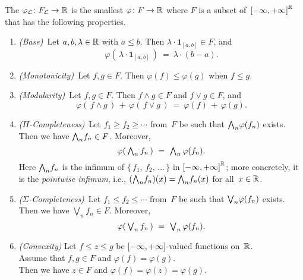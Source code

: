 \documentclass[main.tex]{subfiles}
\begin{document}
\begin{dfn}
\label{D:lebesgue-integral}
The 
$\varphi_{\mathcal{L}} \colon F_{\mathcal{L}} \rightarrow \mathbb{R}$
is the smallest  $\varphi\colon F \rightarrow \mathbb{R}$
where $F$ is a subset of~${[-\infty,+\infty]}^{\mathbb{R}}$
that has the following properties.
\begin{enumerate}
\item
\label{prop:integral-1}
\textit{(Base)}\ 
Let $a,b,\lambda\in\mathbb{R}$ with $a\leq b$. 
Then $\lambda\cdot\mathbf{1}_{[a,b]}\in F$,
and
\begin{equation*}
\varphi(\,\lambda\cdot \mathbf{1}_{[a,b]}\,)\ =\ \lambda\cdot(b-a).
\end{equation*}

\item
\label{prop:integral-2}
\textit{(Monotonicity)}\ 
Let $f,g\in F$.
Then $\varphi(f)\leq \varphi(g)$
when  $f\leq g$.

\item
\label{prop:integral-3}
\textit{(Modularity)}\ 
Let $f,g\in F$.
Then $f\wedge g\in F$ and $f \vee g \in F$, and
\begin{equation*}
\varphi(\,f\wedge g\,)\,+\,\varphi(\,f\vee g\,)\ =\ \varphi(f)\,+\,\varphi(g).
\end{equation*}

\item
\label{prop:integral-4}
\textit{($\Pi$-Completeness)}\ 
Let $f_1 \geq f_2 \geq \dotsb$
from~$F$ be such that $\textstyle{\bigwedge}_n \varphi(f_n)$ exists.\\
Then we have $\textstyle{\bigwedge}_n f_n \in F$.
Moreover,
\begin{equation*}
\varphi(\, \textstyle{ \bigwedge_n f_n }\,) \ =\ \textstyle{\bigwedge}_n \,\varphi(f_n).
\end{equation*}
Here $\textstyle{\bigwedge}_n f_n$
is the infimum of $\{\,f_1,\,f_2,\,\dotsc\,\}$ in ${[-\infty,+\infty]}^{\mathbb{R}}$;
more concretely,
it is the \emph{pointwise infimum}, i.e., $(\textstyle{\bigwedge}_n f_n)(x) = \textstyle{\bigwedge}_n f_n(x)$
for all~$x\in \mathbb{R}$.

\item
\label{prop:integral-5}
\textit{($\Sigma$-Completeness)}\ 
Let $f_1 \leq f_2 \leq \dotsb$
from~$F$ 
be such that $\textstyle{\bigvee}_n \varphi(f_n)$ exists.\\
Then we have $\bigvee_n f_n \in F$.
Moreover,
\begin{equation*}
\varphi(\, \textstyle{ \bigvee_n f_n }\,) \ =\ \textstyle{\bigvee}_n \,\varphi(f_n).
\end{equation*}

\item
\label{prop:integral-6}
\textit{(Convexity)}
Let $f\leq z \leq g$ be ${[-\infty,+\infty]}$-valued functions on~$\mathbb{R}$.\\
Assume that $f,g\in F$ and $\varphi(f)=\varphi(g)$.\\
Then we have $z\in F$ and $\varphi(f) = \varphi(z)= \varphi(g)$.
\end{enumerate}
\end{dfn}
\end{document}

